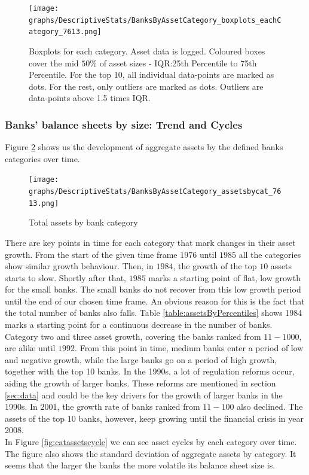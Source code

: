 \documentclass[12pt, a4paper]{article} %
\begin{document}
\begin{figure}[H]
\begin{minipage}{\textwidth}
\texttt{[image: graphs/DescriptiveStats/BanksByAssetCategory\_boxplots\_eachCategory\_7613.png]}
\caption[1]{Boxplots for each category. Asset data is logged. Coloured boxes cover the mid $50\%$ of asset sizes - IQR:25th Percentile to 75th Percentile. For the top 10, all individual data-points are marked as dots. For the rest, only outliers are marked as dots. Outliers are data-points above 1.5 times IQR.}
\label{fig:cat_boxplot}
\end{minipage}
\end{figure}


\subsubsection{Banks' balance sheets by size: Trend and Cycles}
Figure \ref{fig:assetsbycat} shows us the development of aggregate assets by the defined banks categories over time.

\begin{figure}[H]
\begin{minipage}{\textwidth}
\texttt{[image: graphs/DescriptiveStats/BanksByAssetCategory\_assetsbycat\_7613.png]}
\centering
\caption[1]{Total assets by bank category}
\label{fig:assetsbycat}
\end{minipage}
\end{figure}

There are key points in time for each category that mark changes in their asset growth. From the start of the given time frame $1976$ until $1985$ all the categories show similar growth behaviour. Then, in $1984$, the growth of the top $10$ assets starts to slow. Shortly after that, $1985$ marks a starting point of flat, low growth for the small banks. The small banks do not recover from this low growth period until the end of our chosen time frame. An obvious reason for this is the fact that the  total number of banks also falls. Table \ref{table:assetsByPercentiles} shows 1984 marks a starting point for a continuous decrease in the number of banks. Category two and three asset growth, covering the banks ranked from $11-1000$, are alike until $1992$. From this point in time, medium banks enter a period of low and negative growth, while the large banks go on a period of high growth, together with the top 10 banks. In the 1990s, a lot of regulation reforms occur, aiding the growth of larger banks. These reforms are mentioned in section \ref{sec:data} and could be the key drivers for the growth of larger banks in the 1990s. In $2001$, the growth rate of banks ranked from $11-100$ also declined. The assets of the top $10$ banks, however, keep growing until the financial crisis in year 2008.\\
In Figure \ref{fig:catassetscycle} we can see asset cycles by each category over time. The figure also shows the standard deviation of aggregate assets by category. It seems that the larger the banks the more volatile its balance sheet size is.
\end{document}
